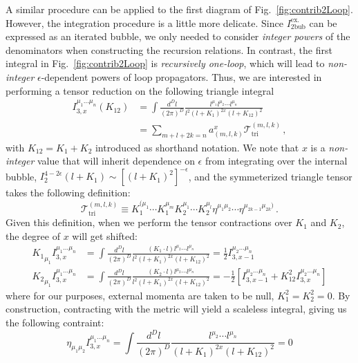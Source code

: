 \documentclass[12pt,letter]{article}
\def\Fig#1{fig.~{\ref{#1}}}
\def\Fig#1{Fig.~{\ref{#1}}}
\begin{document}
A similar procedure can be applied to the first diagram of \Fig{fig:contrib2Loop}. However, the integration procedure is a little more delicate. Since $I^{\text{ex}.}_{\text{2bub}}$ can be expressed as an iterated bubble, we only needed to consider \textit{integer powers} of the denominators when constructing the recursion relations. In contrast, the first integral in \Fig{fig:contrib2Loop} is \textit{recursively one-loop}, which will lead to \textit{non-integer} $\epsilon$-dependent powers of loop propagators. Thus, we are interested in performing a tensor reduction on the following triangle integral
\begin{align}\label{triangleTensorInt}
     I^{\mu_1\dots \mu_n}_{3,x}(K_{12})&= \int \frac{d^D l}{(2\pi)^D} \frac{l^{\mu_1}l^{\mu_2}\cdots l^{\mu_n} }{l^2(l+K_{1})^{2x}(l+K_{12})^2}
     \\
     &= \sum_{m+l+2k=n}a^{x}_{(m,l,k)} \mathcal{T}^{(m,l,k)}_{\text{tri}}\,,
\end{align}
with $K_{12}=K_1+K_2$ introduced as shorthand notation. We note that $x$ is a \textit{non-integer} value that will inherit dependence on $\epsilon$ from integrating over the internal bubble, $I^{4-2\epsilon}_2(l+K_1)\sim [(l+K_1)^2]^{-\epsilon}$, and the symmeterized triangle tensor takes the following definition:
\begin{equation}
\mathcal{T}^{(m,l,k)}_{\text{tri}} \equiv   K_1^{(\mu_1}\cdots K_1^{\mu_m}K_2^{\mu_1}\cdots K_2^{\mu_l}\eta^{\mu_1\mu_2}\cdots \eta^{\mu_{2k-1}\mu_{2k})}\,.
\end{equation}
Given this definition, when we perform the tensor contractions over $K_1$ and $K_2$, the degree of $x$ will get shifted:
\begin{align}
{K_1}_{\mu_1}I^{\mu_1\dots \mu_n}_{3,x}&= \int \frac{d^D l}{(2\pi)^D} \frac{(K_1\cdot l)l^{\mu_2}\cdots l^{\mu_n} }{l^2(l+K_{1})^{2x}(l+K_{12})^2} = \frac{1}{2}I^{\mu_2\dots \mu_n}_{3,x-1}
\\
{K_2}_{\mu_1}I^{\mu_1\dots \mu_n}_{3,x}&= \int \frac{d^D l}{(2\pi)^D} \frac{(K_2\cdot l)l^{\mu_2}\cdots l^{\mu_n} }{l^2(l+K_{1})^{2x}(l+K_{12})^2} = -\frac{1}{2}\left[I^{\mu_2\dots \mu_n}_{3,x-1}+K_{12}^2 I^{\mu_2\dots \mu_n}_{3,x}\right]
\end{align}
where for our purposes, external momenta are taken to be null, $K_1^2=K_2^2 = 0$. By construction, contracting with the metric will yield a scaleless integral, giving us the following contraint:
\begin{equation}
\eta_{\mu_1\mu_2}I^{\mu_1\dots \mu_n}_{3,x}= \int \frac{d^D l}{(2\pi)^D}\frac{l^{\mu_2}\cdots l^{\mu_n} }{(l+K_{1})^{2x}(l+K_{12})^2} = 0
\end{equation}
\end{document}
